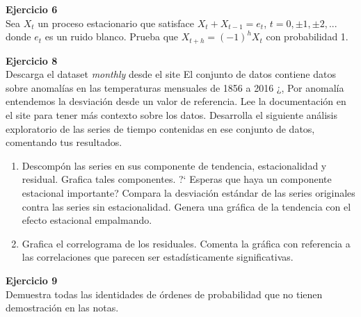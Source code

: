 \documentclass[a4paper, 11pt]{article}
\newenvironment{problem}[2][Ejercicio]
{ \begin{mdframed}[backgroundcolor= red!50] \textbf{#1 #2} \\}
	{  \end{mdframed}}
\begin{document}
\begin{problem}{6}
    Sea $X_t$ un proceso estacionario que satisface $X_t+ X_{t-1}= e_t$, $t= 0,\pm1, \pm2,...$ donde $e_t$ es un ruido blanco. Prueba que $X_{t+h} = (-1)^h X_t$ con probabilidad 1.
\end{problem}

\begin{problem}{8}
    Descarga el dataset \textit{monthly} desde el site 
    El conjunto de datos contiene datos sobre anomalías en las temperaturas mensuales de 1856 a 2016 ¿, Por anomalía entendemos la desviación desde un valor de referencia. Lee la documentación en el site para tener más contexto sobre los datos. Desarrolla el siguiente análisis exploratorio de las series de tiempo contenidas en ese conjunto de datos, comentando tus resultados.
    \begin{enumerate}
        \item Descompón las series en sus componente de tendencia, estacionalidad y residual. Grafica tales componentes. ?` Esperas que haya un componente estacional importante? Compara la desviación estándar de las series originales contra las series sin estacionalidad. Genera una gráfica de la tendencia con el efecto estacional empalmando.
        \item Grafica el correlograma de los residuales. Comenta la gráfica con referencia a las correlaciones que parecen ser estadísticamente significativas.
        
    \end{enumerate}
\end{problem}




\begin{problem}{9}
    Demuestra todas las identidades de órdenes de probabilidad que no tienen demostración en las notas.
\end{problem}
\end{document}

